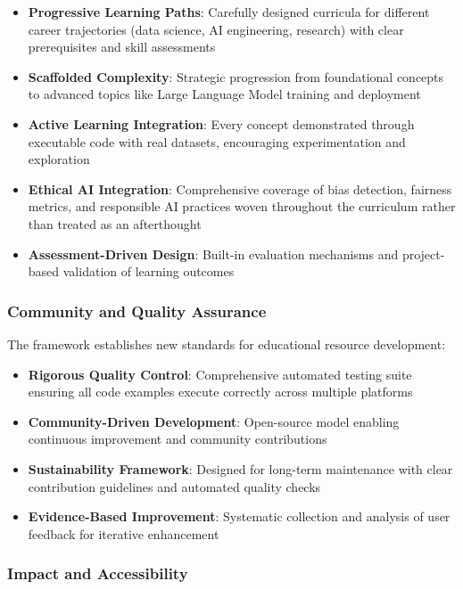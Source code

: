 \begin{itemize}
    \item \textbf{Progressive Learning Paths}: Carefully designed curricula for different career trajectories (data science, AI engineering, research) with clear prerequisites and skill assessments
    \item \textbf{Scaffolded Complexity}: Strategic progression from foundational concepts to advanced topics like Large Language Model training and deployment
    \item \textbf{Active Learning Integration}: Every concept demonstrated through executable code with real datasets, encouraging experimentation and exploration
    \item \textbf{Ethical AI Integration}: Comprehensive coverage of bias detection, fairness metrics, and responsible AI practices woven throughout the curriculum rather than treated as an afterthought
    \item \textbf{Assessment-Driven Design}: Built-in evaluation mechanisms and project-based validation of learning outcomes
\end{itemize}

\subsubsection{Community and Quality Assurance}

The framework establishes new standards for educational resource development:

\begin{itemize}
    \item \textbf{Rigorous Quality Control}: Comprehensive automated testing suite ensuring all code examples execute correctly across multiple platforms
    \item \textbf{Community-Driven Development}: Open-source model enabling continuous improvement and community contributions
    \item \textbf{Sustainability Framework}: Designed for long-term maintenance with clear contribution guidelines and automated quality checks
    \item \textbf{Evidence-Based Improvement}: Systematic collection and analysis of user feedback for iterative enhancement
\end{itemize}

\subsubsection{Impact and Accessibility}

